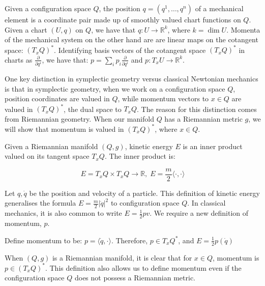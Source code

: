 \begin{defn}
Given a configuration space $Q$, the position $q = (q^{1}, \dots, q^{n})$ 
of a mechanical element is a coordinate pair made up of smoothly valued chart functions on $Q$. Given a chart $(U, q)$ on $Q$, we have that $q: U \to \mathbb{R}^{k}$, where $k = \dim U$. Momenta of the mechanical system on the other hand are are linear maps on the cotangent space: $(T_{x} Q)^{*}$. Identifying basis vectors of the cotangent space $(T_{x} Q)^{*}$ in charts as $\frac{\partial}{\partial q^{i}}$, we have that: $p = \sum_{i} p_{i} \frac{\partial}{\partial q^{i}}$ and $p: T_{x} U \to \mathbb{R}^{k}$. 
\end{defn}

\noindent One key distinction in symplectic geometry versus classical Newtonian mechanics is that in symplectic geometry, when we work on a configuration space $Q$, position coordinates are valued in $Q$, while momentum vectors to $x \in Q$ are valued in $(T_{x} Q)^{*}$, the dual space to $T_{x} Q$. The reason for this distinction comes from Riemannian geometry. When our manifold $Q$ has a Riemannian metric $g$, we will show that momentum is valued in $(T_{x} Q)^{*}$, where $x \in Q$. 

\begin{defn}
Given a Riemannian manifold $(Q, g)$, kinetic energy $E$ is an inner product valued on its tangent space $T_{x} Q$. The inner product is:

$$E = T_{x} Q \times T_{x} Q \to \mathbb{R}, \; E = \frac{m}{2} \langle \cdot, \cdot \rangle$$
\end{defn}

\begin{remark}
Let $q, \dot{q}$ be the position and velocity of a particle. This definition of kinetic energy generalises the formula $E = \frac{m}{2} |\dot{q}|^2$ to configuration space $Q$. In classical mechanics, it is also common to write $E = \frac{1}{2} pv$. We require a new definition of momentum, $p$.  
\end{remark}

\begin{defn}
Define momentum to be: $p = \langle \dot{q}, \cdot \rangle$. Therefore, $p \in T_{x} Q^{*}$, and $E = \frac{1}{2} p(\dot{q})$ 
\end{defn}

\begin{remark}
When $(Q,g)$ is a Riemannian manifold, it is clear that for $x \in Q$, momentum is $p \in (T_{x} Q)^{*}$. This definition also allows us to define momentum even if the configuration space $Q$ does not possess a Riemannian metric. 
\end{remark}

